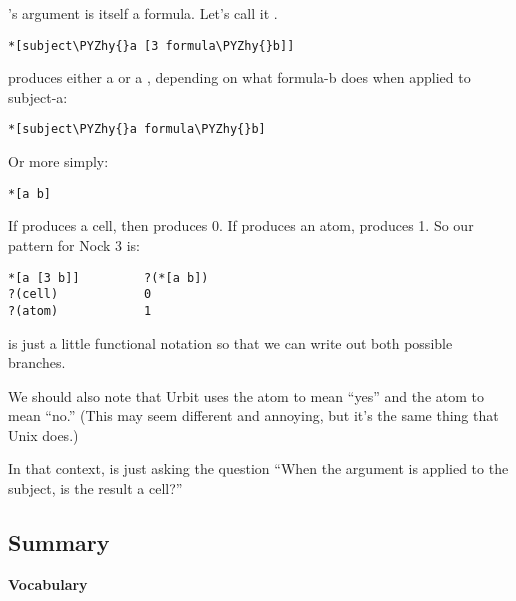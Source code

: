 's argument is itself a formula. Let's call it .
\begin{framed_shaded}
\begin{Verbatim}[fontsize=\relsize{-2.5},commandchars=\\\{\}]
*[subject\PYZhy{}a [3 formula\PYZhy{}b]]
\end{Verbatim}
\end{framed_shaded}
 produces either a  or a , depending on what formula-b does when
applied to subject-a:
\begin{framed_shaded}
\begin{Verbatim}[fontsize=\relsize{-2.5},commandchars=\\\{\}]
*[subject\PYZhy{}a formula\PYZhy{}b]
\end{Verbatim}
\end{framed_shaded}
Or more simply:
\begin{framed_shaded}
\begin{Verbatim}[fontsize=\relsize{-2.5},commandchars=\\\{\}]
*[a b]
\end{Verbatim}
\end{framed_shaded}
If \kode{*[a b]} produces a cell, then \kode{*[a [3 b]]} produces 0. If \kode{*[a b]} produces
an atom, \kode{*[a [3 b]]} produces 1. So our pattern for Nock 3 is:
\begin{framed_shaded}
\begin{Verbatim}[fontsize=\relsize{-2.5},commandchars=\\\{\}]
*[a [3 b]]         ?(*[a b])
?(cell)            0
?(atom)            1
\end{Verbatim}
\end{framed_shaded}
 is just a little functional notation so that we can write out both possible branches.

We should also note that Urbit uses the atom  to mean ``yes'' and the atom 
to mean ``no.'' (This may seem different and annoying, but it's
the same thing that Unix does.)

In that context,  is just asking the question ``When the argument is applied to the subject, is the result a cell?''

\subsection{Summary}

\textbf{Vocabulary}

